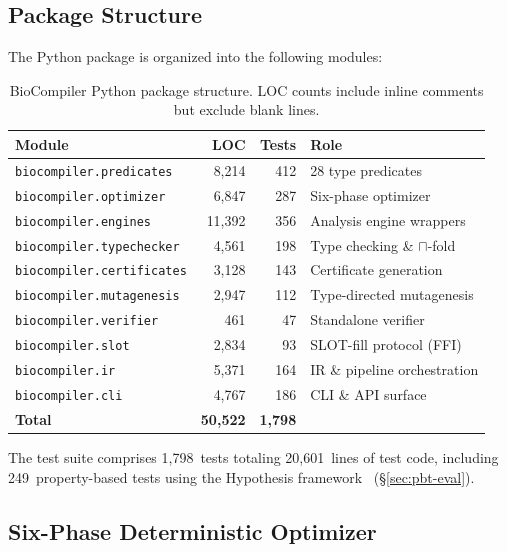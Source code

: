 \documentclass[acmsmall,review,anonymous]{acmart}
\begin{document}
\subsection{Package Structure}\label{sec:package}

The Python package is organized into the following modules:

\begin{table}[t]
\centering
\caption{BioCompiler Python package structure. LOC counts include
         inline comments but exclude blank lines.}
\label{tab:packageloc}
\begin{tabular}{lrrp{3.8cm}}
\toprule
\textbf{Module} & \textbf{LOC} & \textbf{Tests} & \textbf{Role} \\
\midrule
\texttt{biocompiler.predicates}  & 8,214  & 412 & 28 type predicates \\
\texttt{biocompiler.optimizer}   & 6,847  & 287 & Six-phase optimizer \\
\texttt{biocompiler.engines}     & 11,392 & 356 & Analysis engine wrappers \\
\texttt{biocompiler.typechecker} & 4,561  & 198 & Type checking \& $\sqcap$-fold \\
\texttt{biocompiler.certificates}& 3,128  & 143 & Certificate generation \\
\texttt{biocompiler.mutagenesis} & 2,947  & 112 & Type-directed mutagenesis \\
\texttt{biocompiler.verifier}    &    461  &  47 & Standalone verifier \\
\texttt{biocompiler.slot}        & 2,834  &  93 & SLOT-fill protocol (FFI) \\
\texttt{biocompiler.ir}          & 5,371  & 164 & IR \& pipeline orchestration \\
\texttt{biocompiler.cli}         & 4,767  & 186 & CLI \& API surface \\
\midrule
\textbf{Total}                   & \textbf{50,522} & \textbf{1,798} & \\
\bottomrule
\end{tabular}
\end{table}

The test suite comprises 1,798~tests totaling 20,601~lines of test code,
including 249~property-based tests using the Hypothesis
framework~\cite{maciver2019hypothesis} (\S\ref{sec:pbt-eval}).

\subsection{Six-Phase Deterministic Optimizer}\label{sec:optimizer}
\end{document}
